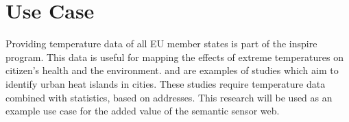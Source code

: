 \section{Use Case}
Providing temperature data of all EU member states is part of the \ac{inspire} program. This data is useful for mapping the effects of extreme temperatures on citizen's health and the environment. \cite{UC:vanderHoeven} and \cite{UC:vanderHoeven2} are examples of studies which aim to identify urban heat islands in cities. These studies require temperature data combined with statistics, based on addresses. This research will be used as an example use case for the added value of the semantic sensor web. 
 

\fi